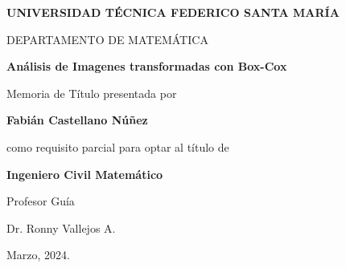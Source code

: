 \thispagestyle{empty}

\begin{center}
\large \textbf{UNIVERSIDAD T\'ECNICA FEDERICO SANTA MAR\'IA}

\vspace{3mm}

\normalsize DEPARTAMENTO DE MATEM\'ATICA
\vspace{35mm}

\Large {\bf An\'alisis de Imagenes transformadas con Box-Cox}

\vspace{35mm}

\normalsize Memoria de T\'itulo presentada por

\vspace{2mm}

\large{\textbf{Fabi\'an Castellano N\'u\~nez}}

\vspace{10mm}

\normalsize como requisito parcial para optar al t\'itulo de

\vspace{2mm}

\textbf{Ingeniero Civil Matem\'atico}

\vspace{15mm}

Profesor Gu\'ia

\vspace{2mm}

Dr. Ronny Vallejos A.

\vspace{5mm}

Marzo, 2024.

\end{center}